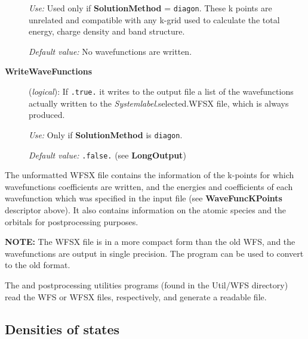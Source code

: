 \begin{description}
\textit{Use:} Used only if \textbf{SolutionMethod} = \texttt{diagon}.
These k points are unrelated and compatible with any k-grid used
to calculate the total energy,  charge density and band structure.

\textit{Default value:} No wavefunctions are written.

\item[\textbf{WriteWaveFunctions}] (\textit{logical}):
   If \texttt{.true.} it writes to the
  output file a list of the wavefunctions actually written to the
\textit{Systemlabel}.selected.WFSX file, which is always produced.

\textit{Use:} Only if \textbf{SolutionMethod} is \texttt{diagon}.

\textit{Default value:} \texttt{.false.} (see \textbf{LongOutput})


\end{description}

The unformatted WFSX file contains the information of the
k-points for which wavefunctions coefficients are written, and the
energies and coefficients of each wavefunction which was specified in
the input file (see \textbf{WaveFuncKPoints} descriptor above). It also contains information
on the atomic species and the orbitals for postprocessing purposes.

 \textbf{NOTE:} The WFSX file is in a more compact
form than the old WFS, and the wavefunctions are output in single
precision. The  program can be used to
convert to the old format.

\noindent
The  and
 postprocessing utilities programs
(found in the Util/WFS directory) read the WFS or WFSX files,
respectively, and generate a readable file.


\vspace{5pt}
\subsection{Densities of states}

